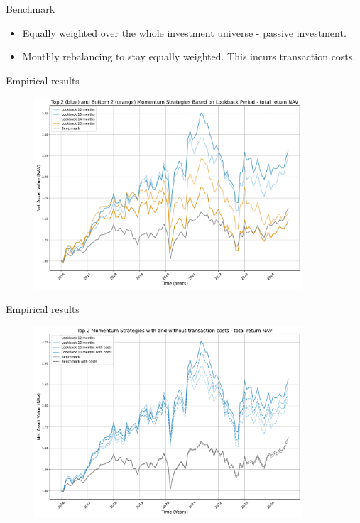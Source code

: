 \documentclass{beamer}
\begin{document}
\begin{frame}[t]{Benchmark}
    \begin{itemize}
        \item Equally weighted over the whole investment universe - passive investment.
        \item Monthly rebalancing to stay equally weighted. This incurs transaction costs.
    \end{itemize}
\end{frame}


\begin{frame}[t]{Empirical results}
    \begin{figure}[t!]\centering
    \includegraphics[width=10cm]{figures/fig_bm.pdf}
    \centering
    \label{fig_bm}
    \end{figure}
    
\end{frame}

\begin{frame}[t]{Empirical results}
    \begin{figure}[t!]\centering
    \includegraphics[width=10cm]{figures/fig_costs.pdf}
    \centering
    \label{fig_costs}
    \end{figure}
    
\end{frame}
\end{document}
